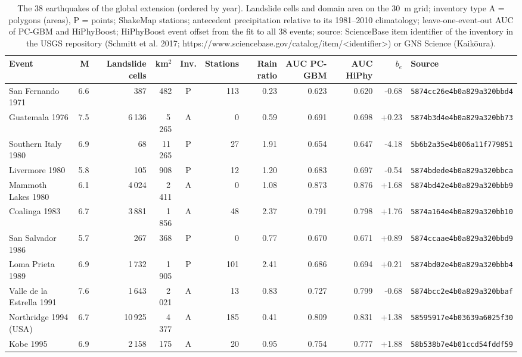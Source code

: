 \begin{longtable}{lrrrcrrrrrl}
\caption{The 38 earthquakes of the global extension (ordered by year). Landslide cells and domain area on the 30~m grid; inventory type A = polygons (areas), P = points; ShakeMap stations; antecedent precipitation relative to its 1981--2010 climatology; leave-one-event-out AUC of PC-GBM and HiPhyBoost; HiPhyBoost event offset from the fit to all 38 events; source: ScienceBase item identifier of the inventory in the USGS repository (Schmitt et al. 2017; https://www.sciencebase.gov/catalog/item/<identifier>) or GNS Science (Kaik\={o}ura).}\label{tab:global}\\
\toprule Event & M & Landslide cells & km$^2$ & Inv. & Stations & Rain ratio & AUC PC-GBM & AUC HiPhy & $b_e$ & Source\\\midrule\endhead
San Fernando 1971 & 6.6 & 387 & 482 & P & 113 & 0.23 & 0.623 & 0.620 & -0.68 & \texttt{\scriptsize 5874cc26e4b0a829a320bbd4}\\
Guatemala 1976 & 7.5 & 6\,136 & 5\,265 & A & 0 & 0.59 & 0.691 & 0.698 & +0.23 & \texttt{\scriptsize 5874b3d4e4b0a829a320bb73}\\
Southern Italy 1980 & 6.9 & 68 & 11\,265 & P & 27 & 1.91 & 0.654 & 0.647 & -4.18 & \texttt{\scriptsize 5b6b2a35e4b006a11f779851}\\
Livermore 1980 & 5.8 & 105 & 908 & P & 12 & 1.20 & 0.683 & 0.697 & -0.54 & \texttt{\scriptsize 5874bdede4b0a829a320bbca}\\
Mammoth Lakes 1980 & 6.1 & 4\,024 & 2\,411 & A & 0 & 1.08 & 0.873 & 0.876 & +1.68 & \texttt{\scriptsize 5874bd42e4b0a829a320bbb9}\\
Coalinga 1983 & 6.7 & 3\,881 & 1\,856 & A & 48 & 2.37 & 0.791 & 0.798 & +1.76 & \texttt{\scriptsize 5874a164e4b0a829a320bb10}\\
San Salvador 1986 & 5.7 & 267 & 368 & P & 0 & 0.77 & 0.670 & 0.671 & +0.89 & \texttt{\scriptsize 5874ccaae4b0a829a320bbd9}\\
Loma Prieta 1989 & 6.9 & 1\,732 & 1\,905 & P & 101 & 2.41 & 0.686 & 0.694 & +0.21 & \texttt{\scriptsize 5874bd02e4b0a829a320bbb4}\\
Valle de la Estrella 1991 & 7.6 & 1\,643 & 2\,021 & A & 13 & 0.83 & 0.727 & 0.799 & -0.68 & \texttt{\scriptsize 5874bcc2e4b0a829a320bbaf}\\
Northridge 1994 (USA) & 6.7 & 10\,925 & 4\,377 & A & 185 & 0.41 & 0.809 & 0.831 & +1.38 & \texttt{\scriptsize 58595917e4b03639a6025f30}\\
Kobe 1995 & 6.9 & 2\,158 & 175 & A & 20 & 0.95 & 0.754 & 0.777 & +1.88 & \texttt{\scriptsize 58b538b7e4b01ccd54fddf59}\\

\end{longtable}
